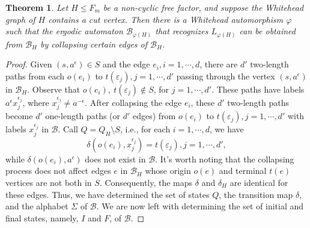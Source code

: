 \documentclass{article}
\newtheorem{mythm}{Theorem}[section]
\newcommand{\B}{\mathcal{B}}
\newcommand{\e}{\epsilon}
\newcommand{\ee}{\varepsilon}
\begin{document}
\begin{mythm}\label{thm:B_from_BH}  
Let $H\leq F_m$ be a non-cyclic free factor, and suppose the Whitehead graph of $H$ contains a cut vertex. Then there is a Whitehead automorphism $\varphi$ such that the ergodic automaton $\B_{\varphi(H)}$ that recognizes $L_{\varphi(H)}$ can be obtained from $\B_H$ by collapsing certain edges of $\B_H$.
\end{mythm}
\begin{proof}
    Given $(s,a^{\e}) \in S$ and the edge $e_i, i = 1, \cdots, d$, there are $d'$ two-length paths from each $o(e_i)$ to $\displaystyle t(\ee_j), j = 1,\cdots,d'$ passing through the vertex $(s,a^{\e})$ in $\B_H$. Observe that $o(e_i), ~\displaystyle t(\ee_j) \notin S$, for $ j = 1,\cdots,d'$. These paths have labels $a^{\e}x_j^{\e_j}$, where $x_j^{\e_j} \neq a^{-\e}$. After collapsing the edge $e_i$, these $d'$ two-length paths become $d'$ one-length paths (or $d'$ edges) from $o(e_i)$ to $t(\ee_j), j = 1,\cdots,d'$ with labels $x_j^{\e_j}$ in $\B$. 
    Call $Q = Q_H\setminus S$, i.e., for each $i = 1, \cdots, d$, we have 
    \begin{equation}
    \delta(o(e_i), x_j^{\e_j}) = t(\ee_j), j = 1,\cdots,d',\label{eqn:B2_transition}    
    \end{equation}
    while $\delta(o(e_i), a^{\e})$ does not exist in $\B$. It's worth noting that the collapsing process does not affect edges $e$ in $\B_H$ whose origin $o(e)$ and terminal $t(e)$ vertices are not both in $S$. Consequently, the maps $\delta$ and $\delta_H$ are identical for these edges. Thus, we have determined the set of states $Q$, the transition map $\delta$, and the alphabet $\Sigma$ of $\B$. We are now left with determining the set of initial and final states, namely, $I$ and $F$, of $\B$.
    

\end{proof}
\end{document}

